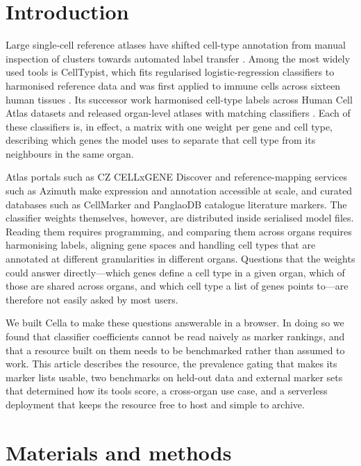 \documentclass[11pt]{article}
\newcommand{\cella}{Cella}
\begin{document}
\linenumbers

\section{Introduction}

Large single-cell reference atlases have shifted cell-type annotation from manual inspection of clusters towards automated label transfer \cite{regev2017,abdelaal2019}. Among the most widely used tools is CellTypist, which fits regularised logistic-regression classifiers to harmonised reference data and was first applied to immune cells across sixteen human tissues \cite{dominguez2022}. Its successor work harmonised cell-type labels across Human Cell Atlas datasets and released organ-level atlases with matching classifiers \cite{xu2023,celltypistorgans}. Each of these classifiers is, in effect, a matrix with one weight per gene and cell type, describing which genes the model uses to separate that cell type from its neighbours in the same organ.

Atlas portals such as CZ CELLxGENE Discover \cite{cellxgene2025} and reference-mapping services such as Azimuth \cite{hao2021} make expression and annotation accessible at scale, and curated databases such as CellMarker \cite{cellmarker2023} and PanglaoDB \cite{panglaodb2019} catalogue literature markers. The classifier weights themselves, however, are distributed inside serialised model files. Reading them requires programming, and comparing them across organs requires harmonising labels, aligning gene spaces and handling cell types that are annotated at different granularities in different organs. Questions that the weights could answer directly---which genes define a cell type in a given organ, which of those are shared across organs, and which cell type a list of genes points to---are therefore not easily asked by most users.

We built \cella{} to make these questions answerable in a browser. In doing so we found that classifier coefficients cannot be read naively as marker rankings, and that a resource built on them needs to be benchmarked rather than assumed to work. This article describes the resource, the prevalence gating that makes its marker lists usable, two benchmarks on held-out data and external marker sets that determined how its tools score, a cross-organ use case, and a serverless deployment that keeps the resource free to host and simple to archive.

\section{Materials and methods}
\end{document}
